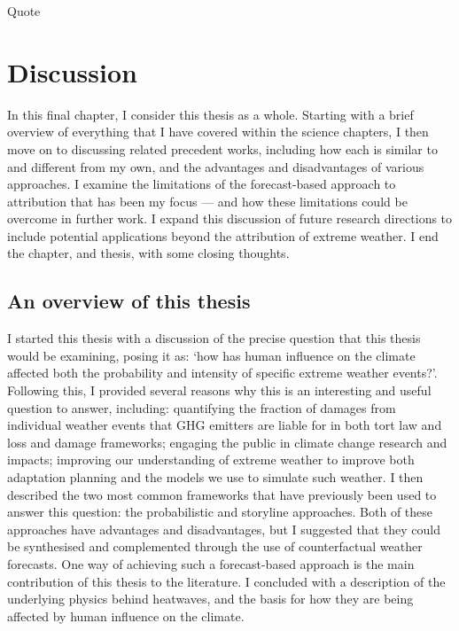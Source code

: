 {\onehalfspacing%
\begin{savequote}[8cm]
    Quote
\end{savequote}
    
\chapter{\label{discussion}Discussion} 

In this final chapter, I consider this thesis as a whole. Starting with a brief overview of everything that I have covered within the science chapters, I then move on to discussing related precedent works, including how each is similar to and different from my own, and the advantages and disadvantages of various approaches. I examine the limitations of the forecast-based approach to attribution that has been my focus --- and how these limitations could be overcome in further work. I expand this discussion of future research directions to include potential applications beyond the attribution of extreme weather. I end the chapter, and thesis, with some closing thoughts.

\clearpage

\minitoc

\clearpage}

\section{An overview of this thesis}\label{discussion:overview}

  I started this thesis with a discussion of the precise question that this thesis would be examining, posing it as: `how has human influence on the climate affected both the probability and intensity of specific extreme weather events?'. Following this, I provided several reasons why this is an interesting and useful question to answer, including: quantifying the fraction of damages from individual weather events that GHG emitters are liable for in both tort law and loss and damage frameworks; engaging the public in climate change research and impacts; improving our understanding of extreme weather to improve both adaptation planning and the models we use to simulate such weather. I then described the two most common frameworks that have previously been used to answer this question: the probabilistic and storyline approaches. Both of these approaches have advantages and disadvantages, but I suggested that they could be synthesised and complemented through the use of counterfactual weather forecasts. One way of achieving such a forecast-based approach is the main contribution of this thesis to the literature. I concluded with a description of the underlying physics behind heatwaves, and the basis for how they are being affected by human influence on the climate.

